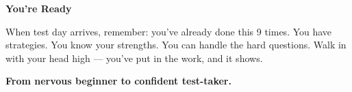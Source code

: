 {\begin{tcolorbox}[
    enhanced,
    colback=funGreenLight,
    colframe=funGreen!50,
    arc=10pt,
    boxrule=1pt,
    left=6mm, right=6mm, top=4mm, bottom=4mm,
]
{\bfseries\color{funGreenDark} \faStar\hspace{2mm}You're Ready}

\vspace{2mm}

When test day arrives, remember: you've already done this 9 times. You have strategies. You know your strengths. You can handle the hard questions. Walk in with your head high — you've put in the work, and it shows.
\end{tcolorbox}

\vspace{4mm}

\begin{center}
{\large\bfseries\color{funBlueDark} \faCrown\hspace{2mm}From nervous beginner to confident test-taker.\hspace{2mm}\faCrown}
\end{center}

}
\newpage
